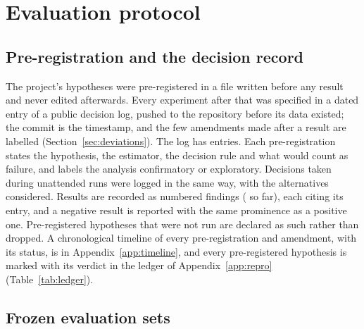 \section{Evaluation protocol}
\label{sec:protocol}

\subsection{Pre-registration and the decision record}
\label{sec:prereg}

The project's hypotheses were pre-registered in a file written before any result and never edited afterwards.
Every experiment after that was specified in a dated entry of a public decision log, pushed to the repository before
its data existed; the commit is the timestamp, and the few amendments made after a result are labelled
(Section~\ref{sec:deviations}).
The log has  entries.
Each pre-registration states the hypothesis, the estimator, the decision rule and what would count as failure, and
labels the analysis confirmatory or exploratory.
Decisions taken during unattended runs were logged in the same way, with the alternatives considered.
Results are recorded as numbered findings ( so far), each citing its entry, and a negative
result is reported with the same prominence as a positive one.
Pre-registered hypotheses that were not run are declared as such rather than dropped.
A chronological timeline of every pre-registration and amendment, with its status, is in Appendix~\ref{app:timeline},
and every pre-registered hypothesis is marked with its verdict in the ledger of Appendix~\ref{app:repro}
(Table~\ref{tab:ledger}).

\subsection{Frozen evaluation sets}
\label{sec:frozen}


